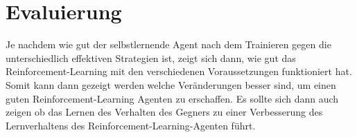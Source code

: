 \section{Evaluierung}
Je nachdem wie gut der selbstlernende Agent nach dem Trainieren gegen die unterschiedlich effektiven Strategien ist, zeigt sich dann, wie gut das Reinforcement-Learning mit den verschiedenen Voraussetzungen funktioniert hat. Somit kann dann gezeigt werden welche Veränderungen besser sind, um einen guten Reinforcement-Learning Agenten zu erschaffen. Es sollte sich dann auch zeigen ob das Lernen des Verhalten des Gegners zu einer Verbesserung des Lernverhaltens des Reinforcement-Learning-Agenten führt.

